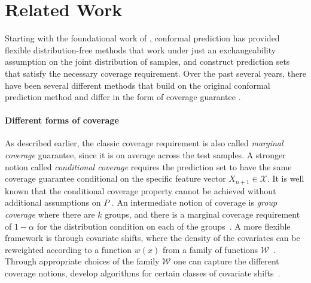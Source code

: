 %
%
\section{Related Work} \label{sec:related}


\iffalse
Starting with the foundational work of \citet{gammerman1998learning}, conformal prediction has provided flexible distribution-free methods that work under just an exchangeability assumption on the joint distribution of samples, and construct prediction sets that satisfy the necessary coverage requirement. Over the past several years, there have been several different methods that build on the original conformal prediction method and differ in the form of coverage guarantee \citep[see e.g.,][for a detailed review of prior work]{Vovkbook, angelopoulos2023survey}. 

\paragraph{Different forms of coverage} As described earlier, the classic coverage requirement is also called {\em marginal coverage} guarantee, since it is on average across the test samples. %
A stronger notion called {\em conditional coverage} requires the prediction set to have the same coverage guarantee conditional on the specific feature vector $X_{n+1} \in \mathcal{X}$. It is well known that the conditional coverage property cannot be achieved without additional assumptions on $P$ \citep{vovk2012conditional,lei2014distribution,foygel2021limits}. An intermediate notion of coverage is {\em group coverage} where there are $k$ groups, and there is a marginal coverage requirement of $1-\alpha$ for the distribution condition on each of the groups~\citep{angelopoulos2023survey, jung2022BatchMC}. A more flexible framework is through covariate shifts, where the density of the covariates can be reweighted according to a function $w(x)$ from a family of functions $\mathcal{W}$~\citep{Gibbs2023conformal}. Through appropriate choices of the family $\mathcal{W}$ one can capture the different coverage notions, develop algorithms for certain classes of covariate shifts~\citep[see e.g.,][]{angelopoulos2023survey, Gibbs2023conformal, kiyani2024length}. 

